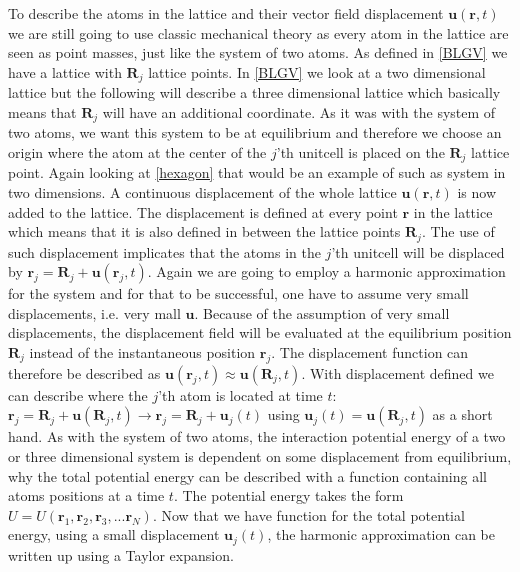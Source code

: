 To describe the atoms in the lattice and their vector field displacement $\mathbf{u}(\mathbf{r},t)$ we are still going to use classic mechanical theory as every atom in the lattice are seen as point masses, just like the system of two atoms. As defined in \cref{BLGV} we have a lattice with $\mathbf{R}_{j}$ lattice points. In \cref{BLGV} we look at a two dimensional lattice but the following will describe a three dimensional lattice which basically means that $\mathbf{R}_{j}$ will have an additional coordinate. As it was with the system of two atoms, we want this system to be at equilibrium and therefore we choose an origin where the atom at the center of the $j$'th unitcell is placed on the $\mathbf{R}_{j}$ lattice point. Again looking at \cref{hexagon} that would be an example of such as system in two dimensions. A continuous displacement of the whole lattice $\mathbf{u}(\mathbf{r},t)$ is now added to the lattice. The displacement is defined at every point $\mathbf{r}$ in the lattice which means that it is also defined in between the lattice points $\mathbf{R}_{j}$. The use of such displacement implicates that the atoms in the $j$'th unitcell will be displaced by $\mathbf{r}_{j}=\mathbf{R}_{j}+\mathbf{u}(\mathbf{r}_{j},t)$. Again we are going to employ a harmonic approximation for the system and for that to be successful, one have to assume very small displacements, i.e. very mall $\mathbf{u}$. Because of the assumption of very small displacements, the displacement field will be evaluated at the equilibrium position $\mathbf{R}_{j}$ instead of the instantaneous position $\mathbf{r}_{j}$. The displacement function can therefore be described as $\mathbf{u}(\mathbf{r}_{j},t)\approx \mathbf{u}(\mathbf{R}_{j},t)$. With displacement defined we can describe where the $j$'th atom is located at time $t$: $\mathbf{r}_{j}=\mathbf{R}_{j}+\mathbf{u}(\mathbf{R}_{j},t)\rightarrow \mathbf{r}_{j}=\mathbf{R}_{j}+\mathbf{u}_{j}(t)$ using $\mathbf{u}_{j}(t)=\mathbf{u}(\mathbf{R}_{j},t)$ as a short hand. As with the system of two atoms, the interaction potential energy of a two or three dimensional system is dependent on some displacement from equilibrium, why the total potential energy can be described with a function containing all atoms positions at a time $t$. The potential energy takes the form $U=U(\mathbf{r}_{1},\mathbf{r}_{2},\mathbf{r}_{3},...\mathbf{r}_{N})$. Now that we have function for the total potential energy, using a small displacement $\mathbf{u}_{j}(t)$, the harmonic approximation can be written up using a Taylor expansion.\begin{align}

\end{align}

